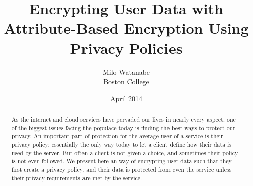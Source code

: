 \documentclass[12pt]{article}
\title {Encrypting User Data with Attribute-Based Encryption Using Privacy Policies}
\author {Milo Watanabe \\ Boston College}
\date{April 2014}
\begin{document}
\maketitle

\begin{abstract}
As the internet and cloud services have pervaded our lives in nearly every aspect, one of the biggest issues facing the populace today is finding the best ways to protect our privacy. An important part of protection for the average user of a service is their privacy policy: essentially the only way today to let a client define how their data is used by the server. But often a client is not given a choice, and sometimes their policy is not even followed.
We present here an way of encrypting user data such that they first create a privacy policy, and their data is protected from even the service unless their privacy requirements are met by the service.
\end{abstract}
\end{document}
